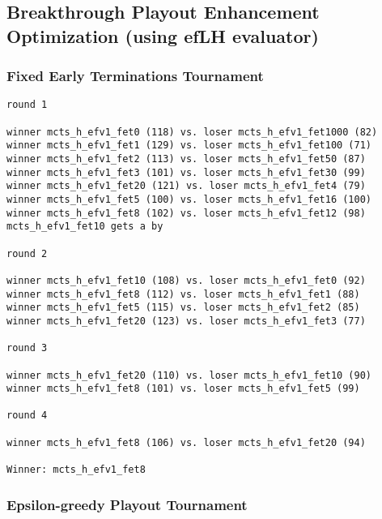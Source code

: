 \documentclass{article}
\begin{document}
\subsection{Breakthrough Playout Enhancement Optimization (using efLH evaluator)}

\subsubsection{Fixed Early Terminations Tournament}

\begin{verbatim}
round 1

winner mcts_h_efv1_fet0 (118) vs. loser mcts_h_efv1_fet1000 (82)
winner mcts_h_efv1_fet1 (129) vs. loser mcts_h_efv1_fet100 (71)
winner mcts_h_efv1_fet2 (113) vs. loser mcts_h_efv1_fet50 (87)
winner mcts_h_efv1_fet3 (101) vs. loser mcts_h_efv1_fet30 (99)
winner mcts_h_efv1_fet20 (121) vs. loser mcts_h_efv1_fet4 (79)
winner mcts_h_efv1_fet5 (100) vs. loser mcts_h_efv1_fet16 (100)
winner mcts_h_efv1_fet8 (102) vs. loser mcts_h_efv1_fet12 (98)
mcts_h_efv1_fet10 gets a by

round 2

winner mcts_h_efv1_fet10 (108) vs. loser mcts_h_efv1_fet0 (92)
winner mcts_h_efv1_fet8 (112) vs. loser mcts_h_efv1_fet1 (88)
winner mcts_h_efv1_fet5 (115) vs. loser mcts_h_efv1_fet2 (85)
winner mcts_h_efv1_fet20 (123) vs. loser mcts_h_efv1_fet3 (77)

round 3

winner mcts_h_efv1_fet20 (110) vs. loser mcts_h_efv1_fet10 (90)
winner mcts_h_efv1_fet8 (101) vs. loser mcts_h_efv1_fet5 (99)

round 4

winner mcts_h_efv1_fet8 (106) vs. loser mcts_h_efv1_fet20 (94)

Winner: mcts_h_efv1_fet8
\end{verbatim}

\subsubsection{Epsilon-greedy Playout Tournament}
\end{document}
